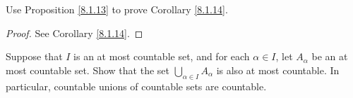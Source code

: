 \begin{exercise}\label{ex 8.1.8}
    Use Proposition \ref{8.1.13} to prove Corollary \ref{8.1.14}.
\end{exercise}

\begin{proof}
    See Corollary \ref{8.1.14}.
\end{proof}

\begin{exercise}\label{ex 8.1.9}
    Suppose that \(I\) is an at most countable set, and for each \(\alpha \in I\), let \(A_{\alpha}\) be an at most countable set.
    Show that the set \(\bigcup_{\alpha \in I} A_{\alpha}\) is also at most countable.
    In particular, countable unions of countable sets are countable.
\end{exercise}

